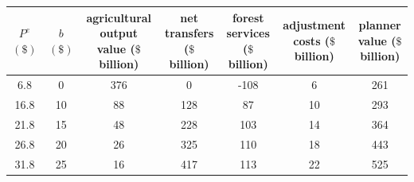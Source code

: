 \begin{tabular}{ccccccc}
\toprule
\makecell[c]{$P^e$ \\ $(\$)$} & \makecell[c]{$b$ \\ $(\$)$} & \makecell[c]{agricultural \\ output value \\ ($\$$ billion)} & \makecell[c]{net \\ transfers \\ ($\$$ billion)} & \makecell[c]{forest \\ services \\ ($\$$ billion)} & \makecell[c]{adjustment \\ costs \\ ($\$$ billion)} & \makecell[c]{planner \\ value \\ ($\$$ billion)} \\
\midrule
 6.8 & 0 & 376 & 0 & -108 & 6 & 261 \\
 16.8 & 10 & 88 & 128 & 87 & 10 & 293 \\
 21.8 & 15 & 48 & 228 & 103 & 14 & 364 \\
 26.8 & 20 & 26 & 325 & 110 & 18 & 443 \\
 31.8 & 25 & 16 & 417 & 113 & 22 & 525 \\
\bottomrule
\end{tabular}
